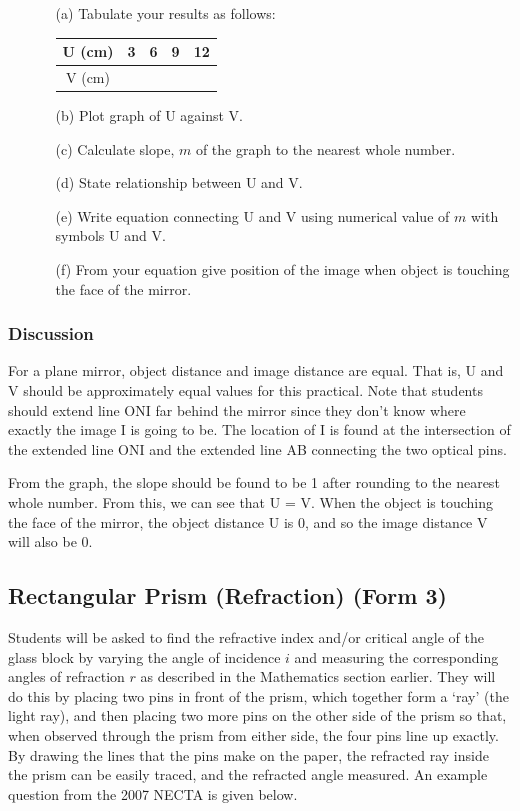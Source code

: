 \begin{enumerate}
\item[]
\begin{enumerate}
\item[(a)] Tabulate your results as follows:

\quad \begin{tabular}{|c|c|c|c|c|} \hline
U (cm) & 3 & 6 & 9 & 12 \\ \hline
V (cm) & & & & \\ \hline
\end{tabular}

\item[(b)] Plot graph of U against V.
\item[(c)] Calculate slope, $m$ of the graph to the nearest whole number.
\item[(d)] State relationship between U and V.
\item[(e)] Write equation connecting U and V using numerical value of $m$ with symbols U and V.
\item[(f)] From your equation give position of the image when object is touching the face of the mirror.
\end{enumerate}
\end{enumerate}

\subsubsection{Discussion}
For a plane mirror, object distance and image distance are equal. That is, U and V should be approximately equal values for this practical. Note that students should extend line ONI far behind the mirror since they don't know where exactly the image I is going to be. The location of I is found at the intersection of the extended line ONI and the extended line AB connecting the two optical pins.

From the graph, the slope should be found to be 1 after rounding to the nearest whole number. From this, we can see that U = V. When the object is touching the face of the mirror, the object distance U is 0, and so the image distance V will also be 0.

\subsection{Rectangular Prism (Refraction) (Form 3)}

Students will be asked to find the refractive index and/or critical angle of the glass block by varying
the angle of incidence $i$ and measuring the corresponding angles of refraction $r$ as
described in the Mathematics section earlier. They will do this by placing two pins in
front of the prism, which together form a `ray' (the light ray), and then placing two more
pins on the other side of the prism so that, when observed through the prism from either
side, the four pins line up exactly. By drawing the lines that the pins make on the paper,
the refracted ray inside the prism can be easily traced, and the refracted angle measured.
An example question from the 2007 NECTA is given below.

